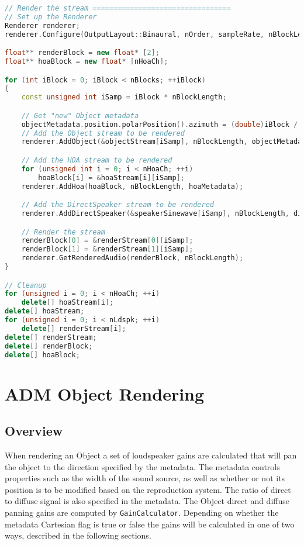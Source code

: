 \documentclass[12pt]{report}
\newcommand{\code}[1]{\texttt{#1}}
\begin{document}
\begin{lstlisting}[language=C++]
// Render the stream =================================
// Set up the Renderer
Renderer renderer;
renderer.Configure(OutputLayout::Binaural, nOrder, sampleRate, nBlockLength, streamInfo);

float** renderBlock = new float* [2];
float** hoaBlock = new float* [nHoaCh];

for (int iBlock = 0; iBlock < nBlocks; ++iBlock)
{
    const unsigned int iSamp = iBlock * nBlockLength;

    // Get "new" Object metadata
    objectMetadata.position.polarPosition().azimuth = (double)iBlock / (double)nBlocks * 360.;
    // Add the Object stream to be rendered
    renderer.AddObject(&objectStream[iSamp], nBlockLength, objectMetadata);

    // Add the HOA stream to be rendered
    for (unsigned int i = 0; i < nHoaCh; ++i)
        hoaBlock[i] = &hoaStream[i][iSamp];
    renderer.AddHoa(hoaBlock, nBlockLength, hoaMetadata);

    // Add the DirectSpeaker stream to be rendered
    renderer.AddDirectSpeaker(&speakerSinewave[iSamp], nBlockLength, directSpeakerMetadata);

    // Render the stream
    renderBlock[0] = &renderStream[0][iSamp];
    renderBlock[1] = &renderStream[1][iSamp];
    renderer.GetRenderedAudio(renderBlock, nBlockLength);
}

// Cleanup
for (unsigned i = 0; i < nHoaCh; ++i)
    delete[] hoaStream[i];
delete[] hoaStream;
for (unsigned i = 0; i < nLdspk; ++i)
    delete[] renderStream[i];
delete[] renderStream;
delete[] renderBlock;
delete[] hoaBlock;
\end{lstlisting}

\section{ADM Object Rendering}\label{AdmObject}

\subsection{Overview}

When rendering an Object a set of loudspeaker gains are calculated that will pan the object to the direction specified by the metadata.
The metadata controls properties such as the width of the sound source, as well as whether or not its position is to be modified based on the reproduction system.
The ratio of direct to diffuse signal is also specified in the metadata.
The Object direct and diffuse panning gains are computed by \code{GainCalculator}.
Depending on whether the metadata Cartesian flag is true or false the gains will be calculated in one of two ways, described in the following sections.
\end{document}
